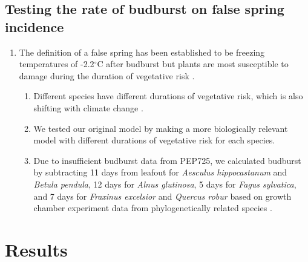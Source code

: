 \documentclass{article}\usepackage[]{graphicx}\usepackage[]{color}
\begin{document}
\subsection*{Testing the rate of budburst on false spring incidence}
\begin{enumerate}
\item The definition of a false spring has been established to be freezing temperatures of -2.2$^{\circ}$C \citep{Schwartz1993} after budburst but plants are most susceptible to damage during the duration of vegetative risk \citep{Augspurger2013, Lenz2016}.
  \begin{enumerate}
\item Different species have different durations of vegetative risk, which is also shifting with climate change \citep{Cleland2006, Fu2015, Xin2016}.%
\item We tested our original model by making a more biologically relevant model with different durations of vegetative risk for each species. 
\item Due to insufficient budburst data from PEP725, we calculated budburst by subtracting 11 days from leafout for \textit{Aesculus hippocastanum} and \textit{Betula pendula}, 12 days for \textit{Alnus glutinosa}, 5 days for \textit{Fagus sylvatica}, and 7 days for \textit{Fraxinus excelsior} and \textit{Quercus robur} based on growth chamber experiment data from phylogenetically related species \citep{Buerki2010, Wang2016, Hipp2017, Flynn2018}.
  \end{enumerate}
\end{enumerate}

\section*{Results}
\end{document}
